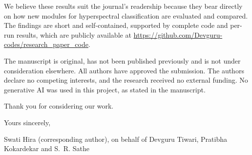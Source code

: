 \documentclass[11pt]{article}
\begin{document}
We believe these results suit the journal's readership because they bear directly on how new modules for hyperspectral classification are evaluated and compared. The findings are short and self-contained, supported by complete code and per-run results, which are publicly available at \url{https://github.com/Devguru-codes/research_paper_code}.

The manuscript is original, has not been published previously and is not under consideration elsewhere. All authors have approved the submission. The authors declare no competing interests, and the research received no external funding. No generative AI was used in this project, as stated in the manuscript.

Thank you for considering our work.

Yours sincerely,

Swati Hira (corresponding author), on behalf of Devguru Tiwari, Pratibha Kokardekar and S.~R. Sathe
\end{document}
